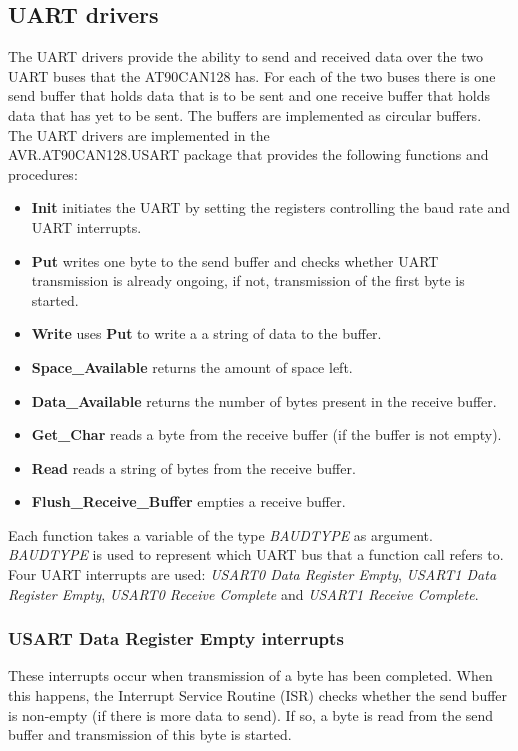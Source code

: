 \subsection{UART drivers}
The UART drivers provide the ability to send and received data over the two UART buses that the AT90CAN128 has. For each of the two buses there is one send buffer that holds data that is to be sent and one receive buffer that holds data that has yet to be sent. The buffers are implemented as circular buffers.  \\
The UART drivers are implemented in the \\
AVR.AT90CAN128.USART package that provides the following functions and procedures:

\begin{itemize}
\item \textbf{Init} initiates the UART by setting the registers controlling the baud rate and UART interrupts.
\item \textbf{Put}  writes one byte to the send buffer and checks whether UART transmission is already ongoing, if not, transmission of the first byte is started. 
\item \textbf{Write} uses \textbf{Put} to write a a string of data to the buffer.
\item \textbf{Space\_Available} returns the amount of space left.
\item \textbf{Data\_Available} returns the number of bytes present in the receive buffer.
\item \textbf{Get\_Char} reads a byte from the receive buffer (if the buffer is not empty).
\item \textbf{Read} reads a string of bytes from the receive buffer.
\item \textbf{Flush\_Receive\_Buffer} empties a receive buffer.
\end{itemize}

Each function takes a variable of the type \textit{BAUDTYPE} as argument. \textit{BAUDTYPE} is used to represent which UART bus that a function call refers to. \\
Four UART interrupts are used: \emph{USART0 Data Register Empty}, \emph{USART1 Data Register Empty}, \emph{USART0 Receive Complete} and \emph{USART1 Receive Complete}. \\


\subsubsection{USART Data Register Empty interrupts}
These interrupts occur when transmission of a byte has been completed. When this happens, the Interrupt Service Routine (ISR) checks whether the send buffer is non-empty (if there is more data to send). If so, a byte is read from the send buffer and transmission of this byte is started.


